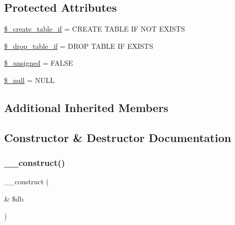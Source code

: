 \subsection*{Protected Attributes}
\begin{DoxyCompactItemize}
\item 
\mbox{\hyperlink{class_c_i___d_b__pdo__sqlite__forge_a2f6484fcb8d1dc3eef67a637227cd583}{\$\+\_\+create\+\_\+table\+\_\+if}} = \textquotesingle{}C\+R\+E\+A\+TE T\+A\+B\+LE IF N\+OT E\+X\+I\+S\+TS\textquotesingle{}
\item 
\mbox{\hyperlink{class_c_i___d_b__pdo__sqlite__forge_a92a8a9145a7fc91e252e58d019373581}{\$\+\_\+drop\+\_\+table\+\_\+if}} = \textquotesingle{}D\+R\+OP T\+A\+B\+LE IF E\+X\+I\+S\+TS\textquotesingle{}
\item 
\mbox{\hyperlink{class_c_i___d_b__pdo__sqlite__forge_aae977ae6d61fa183f0b25422b6ddc31c}{\$\+\_\+unsigned}} = F\+A\+L\+SE
\item 
\mbox{\hyperlink{class_c_i___d_b__pdo__sqlite__forge_ae58fe6a5104d4a069a49b27533ce808f}{\$\+\_\+null}} = \textquotesingle{}N\+U\+LL\textquotesingle{}
\end{DoxyCompactItemize}
\subsection*{Additional Inherited Members}


\subsection{Constructor \& Destructor Documentation}
\mbox{\label{class_c_i___d_b__pdo__sqlite__forge_aaf2ef772755ec6f361d44e16cc9ffd69}} 
\subsubsection{\texorpdfstring{\+\_\+\+\_\+construct()}{\_\_construct()}}
{\footnotesize\ttfamily \+\_\+\+\_\+construct (\begin{DoxyParamCaption}\item[{\&}]{\$db }\end{DoxyParamCaption})}

